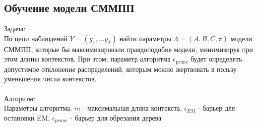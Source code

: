 \documentclass{matmex-diploma-custom}
\begin{document}
\subsection{Обучение модели СММПП}
{\large Задача:} 
\\
По цепи наблюдений $ Y = (y_{1}, ... y_{T}) $ найти параметры $\Lambda = (A,B,C,\pi)$ модели СММПП, которые бы максимизировали правдоподобие модели, минимизируя при этом длины контекстов. При этом, параметр алгоритма $ \epsilon_{\text{prune}} $ будет определять допустимое отклонение распределений, которым можно жертвовать в пользу уменьшения числа контекстов.
\\\\
{\large Алгоритм:}
\\
Параметры алгоритма: 
$ m $ - максимальная длина контекста, 
$ \epsilon_{\textit{EM}} $ - барьер для остановки EM,
$ \epsilon_{\textit{prune}} $ - барьер для обрезания дерева
\\
\end{document}

